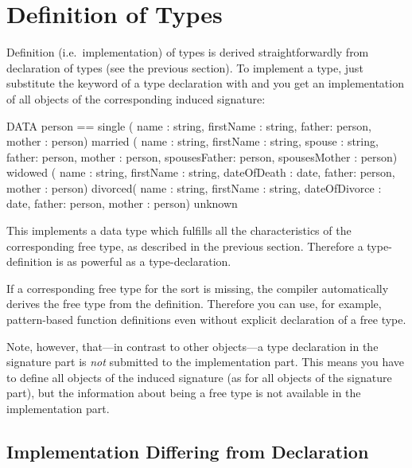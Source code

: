 
\section{Definition of Types}
\label{sec:definition.Types}
 \advanced
Definition (i.e.~implementation) of types is derived straightforwardly from
declaration of  types (see the previous section).
To implement a  type, just substitute the keyword  of a type
declaration with  and you get an implementation of all
objects of the corresponding induced signature:
\begin{prog}
       DATA person == single  ( name : string, firstName : string,
                                father: person, mother : person)
                      married ( name : string, firstName : string,
                                spouse : string,
                                father: person, mother : person,
                                spousesFather: person, 
                                spousesMother : person)
                      widowed ( name : string, firstName : string,
                                dateOfDeath : date,
                                father: person, mother : person)
                      divorced( name : string, firstName : string,
                                dateOfDivorce : date,
                                father: person, mother : person)
                      unknown
\end{prog}

\noindent This implements a data type which fulfills all the
characteristics of 
the corresponding free type, as described in the previous section.
Therefore a type-definition is as powerful as a type-declaration.

\medskip
If a corresponding free type for the sort is missing, the compiler
automatically derives the free type from the definition.
Therefore you can use, for example, pattern-based function definitions even
without explicit declaration of a free type.

Note, however, that---in contrast to other objects---a type declaration in the
signature part is {\em not\/} submitted to the implementation part.
This means you have to define all objects of the induced signature (as for all
objects of the signature part), but the information about being a free
type is not available in the implementation part. 

\subsection{Implementation Differing from Declaration}

